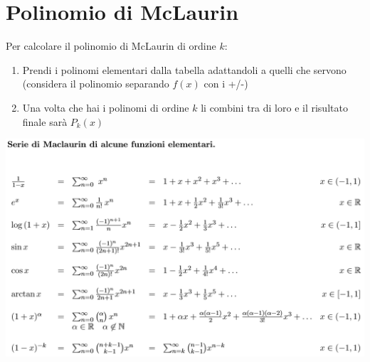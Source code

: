 \documentclass[10pt, a4paper]{article}
\begin{document}
\section{Polinomio di McLaurin}
    Per calcolare il polinomio di McLaurin di ordine $k$:
    \begin{enumerate}
        \item Prendi i polinomi elementari dalla tabella adattandoli a quelli che servono (considera il polinomio separando $f(x)$ con i +/-)
        \item Una volta che hai i polinomi di ordine $k$ li combini tra di loro e il risultato finale sarà $P_k(x)$
    \end{enumerate}
    \includegraphics[width = \textwidth]{Images/seriedimaclaurin.png}
\end{document}
